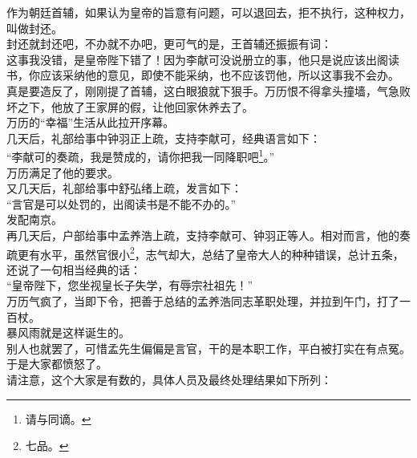 \begin{multicols}{\theparacolNo}
作为朝廷首辅，如果认为皇帝的旨意有问题，可以退回去，拒不执行，这种权力，叫做封还。\\

封还就封还吧，不办就不办吧，更可气的是，王首辅还振振有词：\\

这事我没错，是皇帝陛下错了！因为李献可没说册立的事，他只是说应该出阁读书，你应该采纳他的意见，即使不能采纳，也不应该罚他，所以这事我不会办。\\

真是要造反了，刚刚提了首辅，这白眼狼就下狠手。万历恨不得拿头撞墙，气急败坏之下，他放了王家屏的假，让他回家休养去了。\\

万历的“幸福”生活从此拉开序幕。\\

几天后，礼部给事中钟羽正上疏，支持李献可，经典语言如下：\\

“李献可的奏疏，我是赞成的，请你把我一同降职吧\footnote{请与同谪。}。”\\

万历满足了他的要求。\\

又几天后，礼部给事中舒弘绪上疏，发言如下：\\

“言官是可以处罚的，出阁读书是不能不办的。”\\

发配南京。\\

再几天后，户部给事中孟养浩上疏，支持李献可、钟羽正等人。相对而言，他的奏疏更有水平，虽然官很小\footnote{七品。}，志气却大，总结了皇帝大人的种种错误，总计五条，还说了一句相当经典的话：\\

“皇帝陛下，您坐视皇长子失学，有辱宗社祖先！”\\

万历气疯了，当即下令，把善于总结的孟养浩同志革职处理，并拉到午门，打了一百杖。\\

暴风雨就是这样诞生的。\\

别人也就罢了，可惜孟先生偏偏是言官，干的是本职工作，平白被打实在有点冤。\\

于是大家都愤怒了。\\

请注意，这个大家是有数的，具体人员及最终处理结果如下所列：\\


\end{multicols}
